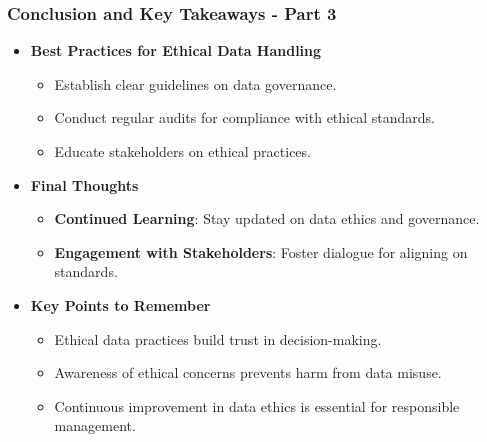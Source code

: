 \documentclass[aspectratio=169]{beamer}
\begin{document}
\begin{frame}[fragile]
    \frametitle{Conclusion and Key Takeaways - Part 3}
    \begin{itemize}
        \item \textbf{Best Practices for Ethical Data Handling}
            \begin{itemize}
                \item Establish clear guidelines on data governance.
                \item Conduct regular audits for compliance with ethical standards.
                \item Educate stakeholders on ethical practices.
            \end{itemize}
        \item \textbf{Final Thoughts}
            \begin{itemize}
                \item \textbf{Continued Learning}: Stay updated on data ethics and governance.
                \item \textbf{Engagement with Stakeholders}: Foster dialogue for aligning on standards.
            \end{itemize}
        \item \textbf{Key Points to Remember}
            \begin{itemize}
                \item Ethical data practices build trust in decision-making.
                \item Awareness of ethical concerns prevents harm from data misuse.
                \item Continuous improvement in data ethics is essential for responsible management.
            \end{itemize}
    \end{itemize}
\end{frame}
\end{document}
